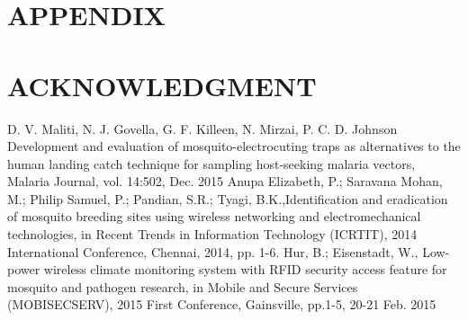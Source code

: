 \documentclass[letterpaper, 10 pt, conference]{ieeeconf}  %
\begin{document}
\section*{APPENDIX}



\section*{ACKNOWLEDGMENT}








\begin{thebibliography}{99}

 D. V. Maliti, N. J. Govella, G. F. Killeen, N. Mirzai, P. C. D. Johnson Development and evaluation of mosquito-electrocuting traps as alternatives to the human landing catch technique for sampling host-seeking malaria vectors, Malaria Journal, vol. 14:502, Dec. 2015
 Anupa Elizabeth, P.; Saravana Mohan, M.; Philip Samuel, P.; Pandian, S.R.; Tyagi, B.K.,Identification and eradication of mosquito breeding sites using wireless networking and electromechanical technologies, in Recent Trends in Information Technology (ICRTIT), 2014 International Conference, Chennai, 2014, pp. 1-6.
 Hur, B.; Eisenstadt, W., Low-power wireless climate monitoring system with RFID security access feature for mosquito and pathogen research, in Mobile and Secure Services (MOBISECSERV), 2015 First Conference, Gainsville, pp.1-5, 20-21 Feb. 2015





\end{thebibliography}
\end{document}
